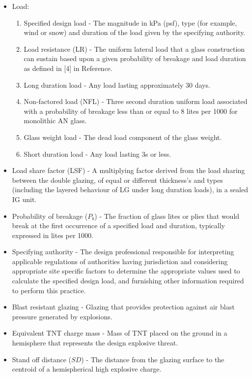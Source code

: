 \documentclass[12pt]{article}
\begin{document}
\begin{itemize}
\item{Load:}
\begin{enumerate}
\item{Specified design load - The magnitude in kPa (psf), type (for example, wind or snow) and duration of the load given by the specifying authority.}
\item{Load resistance (LR) - The uniform lateral load that a glass construction can sustain based upon a given probability of breakage and load duration as defined in [4] in Reference.}
\item{Long duration load - Any load lasting approximately 30 days.}
\item{Non-factored load (NFL) - Three second duration uniform load associated with a probability of breakage less than or equal to 8 lites per 1000 for monolithic AN glass.}
\item{Glass weight load - The dead load component of the glass weight.}
\item{Short duration load - Any load lasting 3s or less.}
\end{enumerate}
\item{Load share factor (LSF) - A multiplying factor derived from the load sharing between the double glazing, of equal or different thickness's and types (including the layered behaviour of LG under long duration loads), in a sealed IG unit.}
\item{Probability of breakage ($P_{b}$) - The fraction of glass lites or plies that would break at the first occurrence of a specified load and duration, typically expressed in lites per 1000.}
\item{Specifying authority - The design professional responsible for interpreting applicable regulations of authorities having jurisdiction and considering appropriate site specific factors to determine the appropriate values used to calculate the specified design load, and furnishing other information required to perform this practice.}
\item{Blast resistant glazing - Glazing that provides protection against air blast pressure generated by explosions.}
\item{Equivalent TNT charge mass - Mass of TNT placed on the ground in a hemisphere that represents the design explosive threat.}
\item{Stand off distance ($SD$) - The distance from the glazing surface to the centroid of a hemispherical high explosive charge.}
\end{itemize}
\end{document}
